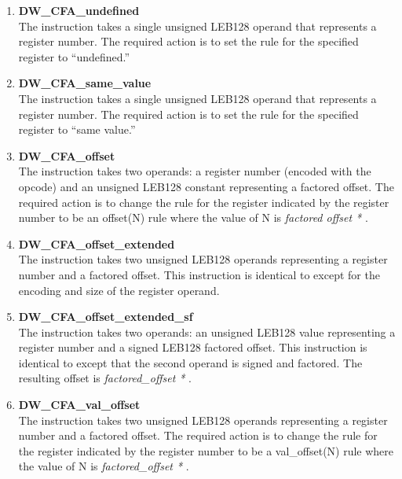 \begin{enumerate}[1.]
\item \textbf{DW\-\_CFA\-\_undefined} \\
The  instruction takes a single unsigned
LEB128 operand that represents a register number. The required
action is to set the rule for the specified register to
``undefined.''

\item \textbf{DW\-\_CFA\-\_same\-\_value} \\
The  instruction takes a single unsigned
LEB128 operand that represents a register number. The required
action is to set the rule for the specified register to
``same value.''

\item \textbf{DW\-\_CFA\-\_offset} \\
The  instruction takes two operands: a register
number (encoded with the opcode) and an unsigned LEB128
constant representing a factored offset. The required action
is to change the rule for the register indicated by the
register number to be an offset(N) rule where the value of
N is 
\textit{factored offset * }.

\item \textbf{DW\-\_CFA\-\_offset\-\_extended} \\
The  instruction takes two unsigned
LEB128 operands representing a register number and a factored
offset. This instruction is identical to  except
for the encoding and size of the register operand.

\item \textbf{ DW\-\_CFA\-\_offset\-\_extended\-\_sf} \\
The  instruction takes two operands:
an unsigned LEB128 value representing a register number and a
signed LEB128 factored offset. This instruction is identical
to  except that the second operand is
signed and factored. The resulting offset is 
\textit{factored\_offset * }.

\item \textbf{DW\-\_CFA\-\_val\-\_offset} \\
The  instruction takes two unsigned
LEB128 operands representing a register number and a
factored offset. The required action is to change the rule
for the register indicated by the register number to be a
val\_offset(N) rule where the value of N is 
\textit{factored\_offset * }.


\end{enumerate}
